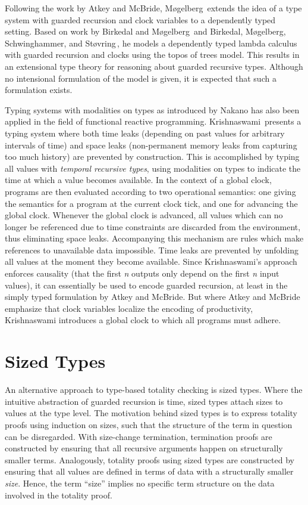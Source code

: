 Following the work by Atkey and McBride, M\o gelberg\,\citep{Mogelberg:2014} extends the idea of a type system with guarded recursion and clock variables to a dependently typed setting. Based on work by Birkedal and M\o gelberg\,\citep{BirkedalL:sgdtuniverse-conf} and Birkedal, M\o gelberg, Schwinghammer, and St\o vring\,\citep{BirkedalL:sgdt-journal}, he models a dependently typed lambda calculus with guarded recursion and clocks using the topos of trees model. This results in an extensional type theory for reasoning about guarded recursive types. Although no intensional formulation of the model is given, it is expected that such a formulation exists.

Typing systems with modalities on types as introduced by Nakano has also been applied in the field of functional reactive programming. Krishnaswami\,\citep{Krishnaswami13} presents a typing system where both time leaks (depending on past values for arbitrary intervals of time) and space leaks (non-permanent memory leaks from capturing too much history) are prevented by construction. This is accomplished by typing all values with \emph{temporal recursive types}, using modalities on types to indicate the time at which a value becomes available. In the context of a global clock, programs are then evaluated according to two operational semantics: one giving the semantics for a program at the current clock tick, and one for advancing the global clock. Whenever the global clock is advanced, all values which can no longer be referenced due to time constraints are discarded from the environment, thus eliminating space leaks. Accompanying this mechanism are rules which make references to unavailable data impossible. Time leaks are prevented by unfolding all values at the moment they become available. Since Krishnaswami's approach enforces causality (that the first \emph{n} outputs only depend on the first \emph{n} input values), it can essentially be used to encode guarded recursion, at least in the simply typed formulation by Atkey and McBride. But where Atkey and McBride emphasize that clock variables localize the encoding of productivity, Krishnaswami introduces a global clock to which all programs must adhere.

\section{Sized Types}
An alternative approach to type-based totality checking is sized types. Where the intuitive abstraction of guarded recursion is time, sized types attach sizes to values at the type level. The motivation behind sized types is to express totality proofs using induction on sizes, such that the structure of the term in question can be disregarded. With size-change termination, termination proofs are constructed by ensuring that all recursive arguments happen on structurally smaller terms. Analogously, totality proofs using sized types are constructed by ensuring that all values are defined in terms of data with a structurally smaller \emph{size}.  Hence, the term ``size'' implies no specific term structure on the data involved in the totality proof.

